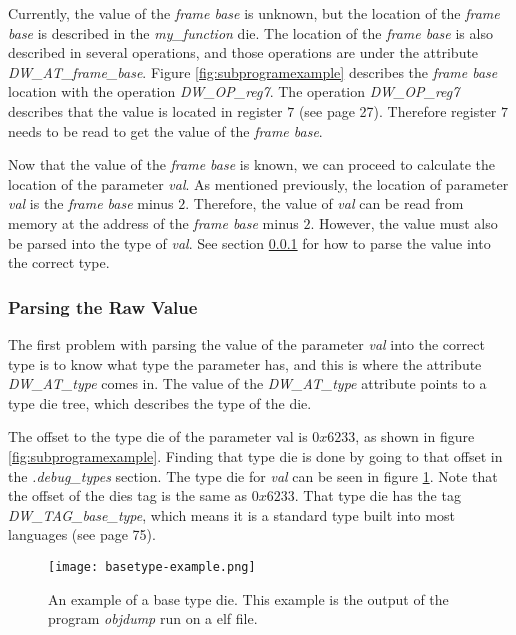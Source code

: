 Currently, the value of the \emph{frame base} is unknown, but the location of the \emph{frame base} is described in the \emph{my\_function} \gls{die}.
The location of the \emph{frame base} is also described in several operations, and those operations are under the attribute \emph{DW\_AT\_frame\_base}.
Figure \ref{fig:subprogramexample} describes the \emph{frame base} location with the operation \emph{DW\_OP\_reg7}.
The operation \emph{DW\_OP\_reg7} describes that the value is located in register $7$ (see \cite{dwarf} page 27).
Therefore register $7$ needs to be read to get the value of the \emph{frame base}.


Now that the value of the \emph{frame base} is known, we can proceed to calculate the location of the parameter \emph{val}.
As mentioned previously, the location of parameter \emph{val} is the \emph{frame base} minus $2$.
Therefore, the value of \emph{val} can be read from memory at the address of the \emph{frame base} minus $2$.
However, the value must also be parsed into the type of \emph{val}.
See section \ref{sec:parsingvalue} for how to parse the value into the correct type.


\subsubsection{Parsing the Raw Value} \label{sec:parsingvalue}
The first problem with parsing the value of the parameter \emph{val} into the correct type is to know what type the parameter has, and this is where the attribute \emph{DW\_AT\_type} comes in.
The value of the \emph{DW\_AT\_type} attribute points to a type \gls{die} tree, which describes the type of the \gls{die}.


The offset to the type \gls{die} of the parameter val is $0x6233$, as shown in figure \ref{fig:subprogramexample}.
Finding that type \gls{die} is done by going to that offset in the \emph{.debug\_types} section.
  The type \gls{die} for \emph{val} can be seen in figure \ref{fig:basetypeexample}.
  Note that the offset of the \glspl{die} tag is the same as $0x6233$.
  That type \gls{die} has the tag \emph{DW\_TAG\_base\_type}, which means it is a standard type built into most languages (see \cite{dwarf} page 75).


\begin{figure}[h]
	\centering
	\texttt{[image: basetype-example.png]}
	\caption{An example of a base type \gls{die}. This example is the output of the program \emph{objdump} run on a \gls{elf} file.}
	\label{fig:basetypeexample}
\end{figure}


